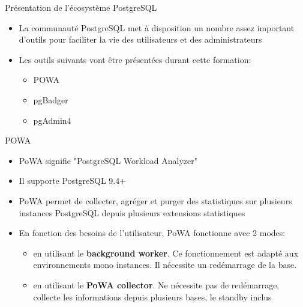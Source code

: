 \begin{frame}{Présentation de l'écosystème PostgreSQL}

   \begin{itemize}
      \item La communauté PostgreSQL met à disposition un nombre assez important d'outils pour faciliter la vie des utilisateurs et des administrateurs
      \item Les outils suivants vont être présentées durant cette formation:
      \begin{itemize}
         \item POWA
         \item pgBadger
         \item pgAdmin4
      \end{itemize}
   \end{itemize}


\end{frame}


\begin{frame}{POWA}

   \begin{itemize}
      \item PoWA signifie "PostgreSQL Workload Analyzer"
      \item Il supporte PostgreSQL 9.4+
      \item PoWA permet de collecter, agréger et purger des statistiques sur plusieurs instances PostgreSQL depuis plusieurs extensions statistiques
      \item En fonction des besoins de l'utilisateur, PoWA fonctionne avec 2 modes:
   \begin{itemize}
         \item en utilisant le \textbf{background worker}. Ce fonctionnement est adapté aux environnements mono instances. Il nécessite un redémarrage de la base.
         \item en utilisant le \textbf{PoWA collector}. Ne nécessite pas de redémarrage, collecte les informations depuis plusieurs bases, le standby inclus
   \end{itemize}

   \end{itemize}

\begin{tiny}
\begin{toile}
\end{toile}
\end{tiny}

\end{frame}

